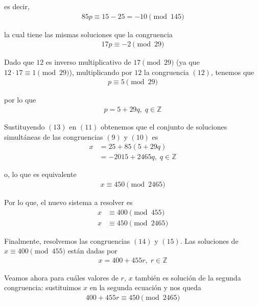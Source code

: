 \documentclass[letterpaper,11pt]{article}
\begin{document}
\begin{enumerate}
\begin{itemize}
        es decir,
        \begin{align*}
            85p \equiv 15 - 25 = -10 \pmod{145}
        \end{align*}
        
        la cual tiene las mismas soluciones que la congruencia 
        \begin{align}
            17p \equiv -2 \pmod{29}
        \end{align}
        
        Dado que $12$ es inverso multiplicativo de $17 \pmod{29}$ (ya que 
        $12 \cdot 17 \equiv 1 \pmod{29}$), multiplicando por $12$ la congruencia
        $(12)$, tenemos que 
        \begin{align*}
            p \equiv 5 \pmod{29} 
        \end{align*}
        
        por lo que 
        \begin{align}
            p = 5 + 29q, \; q \in \mathbb{Z}
        \end{align}
        
        Sustituyendo $(13)$ en $(11)$ obtenemos que el conjunto de soluciones
        simultáneas de las congruencias $(9)$ y $(10)$ es
        \begin{align*}
            x 
            &= 25 + 85(5 + 29q) \\
            &= -2015 + 2465q, \; q \in \mathbb{Z}
        \end{align*}
        
        o, lo que es equivalente
        \begin{align*}
            x \equiv 450 \pmod{2465}
        \end{align*}
        
        Por lo que, el nuevo sistema a resolver es
        \begin{align}
            x &\equiv 400 \pmod{455} \\
            x &\equiv 450 \pmod{2465}
        \end{align}
        
        Finalmente, resolvemos las congruencias $(14)$ y $(15)$. Las soluciones 
        de $x \equiv 400 \pmod{455}$ están dadas por
        \begin{align}
            x = 400 + 455r, \; r \in \mathbb{Z}
        \end{align}
        
        Veamos ahora para cuáles valores de $r$, $x$ también es solución de la
        segunda congruencia: sustituimos $x$ en la segunda ecuación y nos
        queda
        \begin{align*}
            400 + 455r \equiv 450 \pmod{2465}
        \end{align*}
        

\end{itemize}
\end{enumerate}
\end{document}
